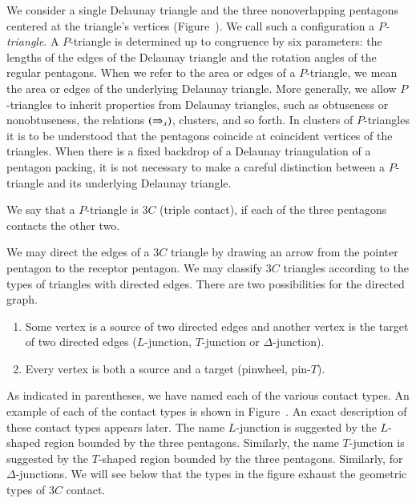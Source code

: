 

We consider a single Delaunay triangle and the three nonoverlapping
pentagons centered at the triangle's vertices
(Figure~).  We call such a configuration a {\it
  $P$-triangle}.  A $P$-triangle is determined up to congruence by six
parameters: the lengths of the edges of the Delaunay triangle and the
rotation angles of the regular pentagons.  When we refer to the area
or edges of a $P$-triangle, we mean the area or edges of the
underlying Delaunay triangle.  More generally, we allow $P$-triangles
to inherit properties from Delaunay triangles, such as obtuseness or
nonobtuseness, the relations $(\Rightarrow_{x})$, clusters, and so forth. In
clusters of $P$-triangles it is to be understood that the pentagons
coincide at coincident vertices of the triangles.  When there is a
fixed backdrop of a Delaunay triangulation of a pentagon packing, it
is not necessary to make a careful distinction between a
$P$-triangle and its underlying Delaunay triangle.

We say that a $P$-triangle is $3C$ (triple contact),
if each of the three pentagons contacts the other two.

We may direct the edges of a $3C$ triangle by drawing an arrow from
the pointer pentagon to the receptor pentagon.  We may classify $3C$
triangles according to the types of triangles with directed edges.
There are two possibilities for the directed graph.
\begin{enumerate}
\item Some vertex is a source of two directed edges and another vertex
is the target of two directed edges  ($L$-junction, $T$-junction or
  $\Delta$-junction).
\item Every vertex is both a source and a target (pinwheel, pin-$T$).
\end{enumerate}

As indicated in parentheses, we have named each of the various contact
types.  An example of each of the contact types is shown in
Figure~.  An exact description of these contact types
appears later.  The name $L$-junction is suggested by the $L$-shaped
region bounded by the three pentagons.  Similarly, the name
$T$-junction is suggested by the $T$-shaped region bounded by the
three pentagons.  Similarly, for $\Delta$-junctions.  We will see
below that the types in the figure exhaust the geometric types of
$3C$ contact.


